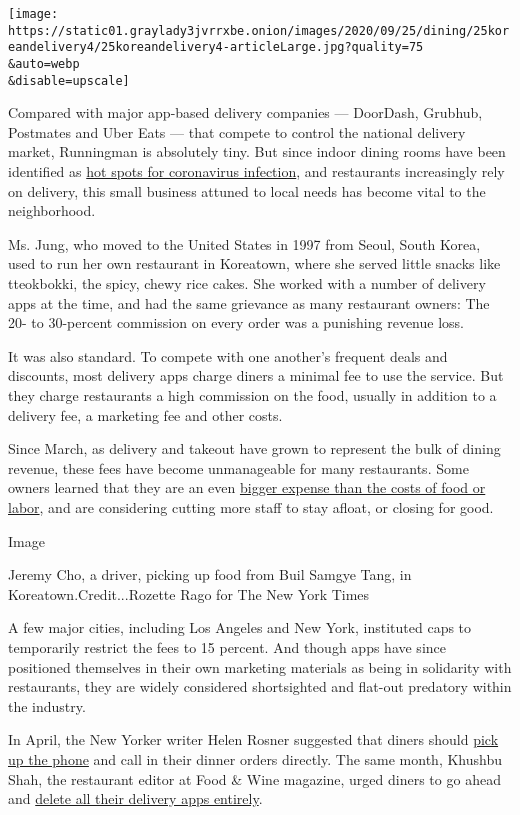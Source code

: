 \texttt{[image: https://static01.graylady3jvrrxbe.onion/images/2020/09/25/dining/25koreandelivery4/25koreandelivery4-articleLarge.jpg?quality=75\\\&auto=webp\\\&disable=upscale]}

Compared with major app-based delivery companies --- DoorDash, Grubhub,
Postmates and Uber Eats --- that compete to control the national
delivery market, Runningman is absolutely tiny. But since indoor dining
rooms have been identified as
\href{https://www.nytimes3xbfgragh.onion/2020/08/12/health/Covid-restaurants-bars.html}{hot
spots for coronavirus infection}, and restaurants increasingly rely on
delivery, this small business attuned to local needs has become vital to
the neighborhood.

Ms. Jung, who moved to the United States in 1997 from Seoul, South
Korea, used to run her own restaurant in Koreatown, where she served
little snacks like tteokbokki, the spicy, chewy rice cakes. She worked
with a number of delivery apps at the time, and had the same grievance
as many restaurant owners: The 20- to 30-percent commission on every
order was a punishing revenue loss.

It was also standard. To compete with one another's frequent deals and
discounts, most delivery apps charge diners a minimal fee to use the
service. But they charge restaurants a high commission on the food,
usually in addition to a delivery fee, a marketing fee and other costs.

Since March, as delivery and takeout have grown to represent the bulk of
dining revenue, these fees have become unmanageable for many
restaurants. Some owners learned that they are an even
\href{https://www.nytimes3xbfgragh.onion/2020/06/09/technology/delivery-apps-restaurants-fees-virus.html}{bigger
expense than the costs of food or labor}, and are considering cutting
more staff to stay afloat, or closing for good.

Image

Jeremy Cho, a driver, picking up food from Buil Samgye Tang, in
Koreatown.Credit...Rozette Rago for The New York Times

A few major cities, including Los Angeles and New York, instituted caps
to temporarily restrict the fees to 15 percent. And though apps have
since positioned themselves in their own marketing materials as being in
solidarity with restaurants, they are widely considered shortsighted and
flat-out predatory within the industry.

In April, the New Yorker writer Helen Rosner suggested that diners
should
\href{https://www.newyorker.com/culture/annals-of-gastronomy/pick-up-the-damn-phone-and-other-thoughts-on-ordering-restaurant-delivery}{pick
up the phone} and call in their dinner orders directly. The same month,
Khushbu Shah, the restaurant editor at Food \& Wine magazine, urged
diners to go ahead and
\href{https://www.foodandwine.com/fwpro/delete-your-delivery-apps}{delete
all their delivery apps entirely}.


